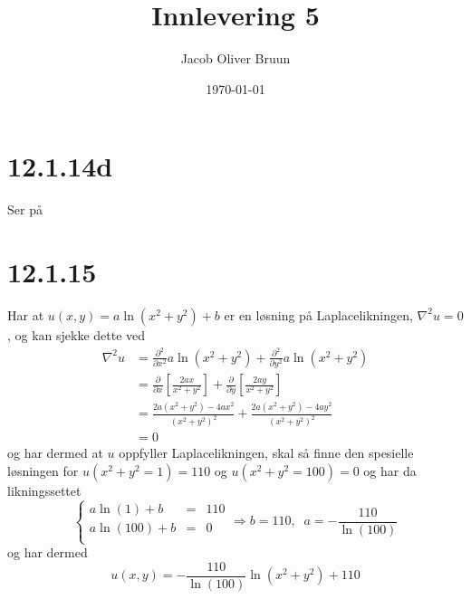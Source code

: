 \documentclass{report}
\title{Innlevering 5}
\author{Jacob Oliver Bruun}
\date{\today}
\newcommand{\nbrack}[1]{\left( #1 \right)}
\newcommand{\bbrack}[1]{\left[ #1 \right]}
\begin{document}
\section*{12.1.14d}
Ser på


\section*{12.1.15}
Har at $u(x, y) = a \ln (x^{2} + y^{2}) + b$ er en løsning på Laplacelikningen, $\nabla^{2} u = 0$, og kan sjekke dette ved
\begin{equation}
  \label{eq:1}
  \begin{split}
    \nabla^{2} u &= \frac{\partial^{2}}{\partial x^{2}} a \ln \nbrack{ x^{2} + y^{2} } + \frac{\partial^{2}}{\partial y^{2}} a \ln \nbrack{ x^{2} + y^{2} } \\
                 &= \frac{\partial}{\partial x} \bbrack{ \frac{2ax}{x^{2} + y^{2}} } + \frac{\partial}{\partial y} \bbrack{ \frac{2ay}{x^{2} + y^{2}} } \\
                 &= \frac{ 2a\nbrack{ x^{2} + y^{2} } - 4ax^{2} }{ \nbrack{ x^{2} + y^{2} }^{2} } +  \frac{ 2a\nbrack{ x^{2} + y^{2} } - 4ay^{2} }{ \nbrack{ x^{2} + y^{2} }^{2} } \\
                 &= 0
  \end{split}
\end{equation}
og har dermed at $u$ oppfyller Laplacelikningen, skal så finne den spesielle løsningen for $u \nbrack{ x^{2} + y^{2} = 1 } = 110$ og $u \nbrack{ x^{2} + y^{2} = 100 } = 0$ og har da likningssettet
\begin{equation}
  \label{eq:2}
  \left\lbrace
  \begin{array}{rcl}
    a\ln(1) + b & = & 110 \\
    a\ln(100) + b & = & 0 \\
  \end{array} \right. \Rightarrow
  b = 110, \;\; a = - \frac{110}{\ln (100)}
\end{equation}
og har dermed
\begin{equation}
  \label{eq:3}
  u(x, y) = - \frac{110}{\ln (100)} \ln\nbrack{ x^{2} + y^{2} } + 110
\end{equation}
\end{document}
